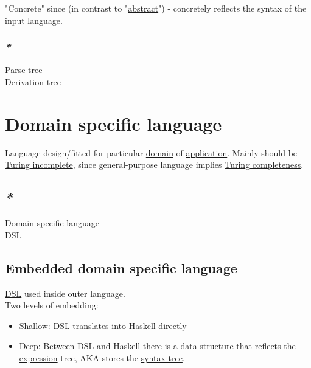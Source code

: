 \documentclass[a4paper,14pt,oneside]{book}
\begin{document}
"Concrete" since (in contrast to "\hyperref[org939195a]{abstract}") - concretely reflects the syntax of the input language.\\

\subsection{\emph{*}}
\label{sec:org846a75e}

\label{orgca13eed}Parse tree\\
\label{orgbca4169}Derivation tree\\

\chapter{\label{orgc83cefb}Domain specific language}
\label{sec:orgfe0eeaf}
Language design/fitted for particular \hyperref[org0cadcd1]{domain} of \hyperref[orgf3301f1]{application}. Mainly should be \hyperref[orgc61f247]{Turing incomplete}, since general-purpose language implies \hyperref[orga0d5dad]{Turing completeness}.\\

\section{\emph{*}}
\label{sec:org5fefcc9}

\label{org2a6e9db}Domain-specific language\\
\label{orgefeb256}DSL\\

\section{\label{org3c6605f}Embedded domain specific language}
\label{sec:org9ce3071}

\hyperref[orgefeb256]{DSL} used inside outer language.\\

Two levels of embedding:\\

\begin{itemize}
\item Shallow: \hyperref[orgefeb256]{DSL} translates into Haskell directly\\
\item Deep: Between \hyperref[orgefeb256]{DSL} and Haskell there is a \hyperref[org8b4a18b]{data structure} that reflects the \hyperref[orgade06d7]{expression} tree, AKA stores the \hyperref[org266fdb1]{syntax tree}.\\
\end{itemize}
\end{document}
